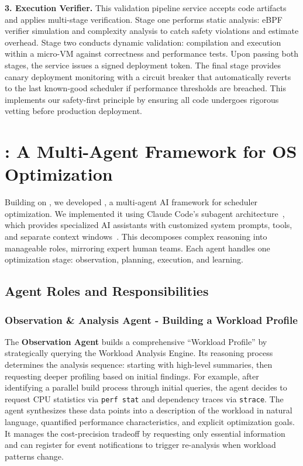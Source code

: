 \textbf{3. Execution Verifier.} This validation pipeline service accepts code artifacts and applies multi-stage verification. Stage one performs static analysis: eBPF verifier simulation and complexity analysis to catch safety violations and estimate overhead. Stage two conducts dynamic validation: compilation and execution within a micro-VM against correctness and performance tests. Upon passing both stages, the service issues a signed deployment token. The final stage provides canary deployment monitoring with a circuit breaker that automatically reverts to the last known-good scheduler if performance thresholds are breached. This implements our safety-first principle by ensuring all code undergoes rigorous vetting before production deployment.

\section{\agent: A Multi-Agent Framework for OS Optimization}
\label{sec:sched_agents}

Building on \sys, we developed \textbf{\agent}, a multi-agent AI framework for scheduler optimization. We implemented it using Claude Code's subagent architecture~\cite{anthropic2024subagents}, which provides specialized AI assistants with customized system prompts, tools, and separate context windows~\cite{anthropic2024multiagent}. This decomposes complex reasoning into manageable roles, mirroring expert human teams. Each agent handles one optimization stage: observation, planning, execution, and learning.

\subsection{Agent Roles and Responsibilities}

\subsubsection{Observation \& Analysis Agent - Building a Workload Profile}

The \textbf{Observation Agent} builds a comprehensive ``Workload Profile'' by strategically querying the Workload Analysis Engine. Its reasoning process determines the analysis sequence: starting with high-level summaries, then requesting deeper profiling based on initial findings. For example, after identifying a parallel build process through initial queries, the agent decides to request CPU statistics via \texttt{perf stat} and dependency traces via \texttt{strace}. The agent synthesizes these data points into a description of the workload in natural language, quantified performance characteristics, and explicit optimization goals. It manages the cost-precision tradeoff by requesting only essential information and can register for event notifications to trigger re-analysis when workload patterns change.

